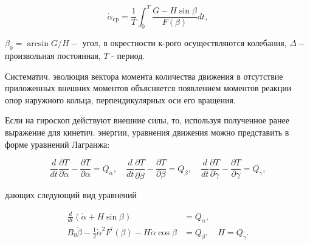 \documentclass[10pt]{article}
\begin{document}
\[

\dot{\alpha}_{\mathrm{cp}}=\frac{1}{T} \int_{0}^{T} \frac{G-H \sin \beta}{F(\beta)} d t,

\]



$\beta_{0}=\arcsin G / H-$ угол, в окрестности к-рого осуществляются колебания, $\Delta-$ произвольная постоянная, $T$ - период.



Систематич. эволюция вектора момента количества движения в отсутствие приложенных внешних моментов объясняется появлением моментов реакции опор наружного кольца, перпендикулярных оси его вращения.



Если на гироскоп действуют внешние силы, то, используя полученное ранее выражение для кинетич. энергии, уравнения движения можно представить в форме уравнений Лагранжа:



\[

\frac{d}{d t} \frac{\partial T}{\partial \dot{\alpha}}-\frac{\partial T}{\partial \alpha}=Q_{\alpha}, \quad \frac{d}{d t} \frac{\partial T}{\partial \dot{\beta}}-\frac{\partial T}{\partial \beta}=Q_{\beta}, \quad \frac{d}{d t} \frac{\partial T}{\partial \dot{\gamma}}-\frac{\partial T}{\partial \gamma}=Q_{\gamma},

\]



дающих следующий вид уравнений



\[

\begin{aligned}

\frac{d}{d t}(\dot{\alpha}+H \sin \beta) & =Q_{\alpha}, \\

B_{0} \ddot{\beta}-\frac{1}{2} \dot{\alpha}^{2} F^{\prime}(\beta)-H \dot{\alpha} \cos \beta & =Q_{\beta}, \quad \dot{H}=Q_{\gamma} .

\end{aligned}

\]
\end{document}
